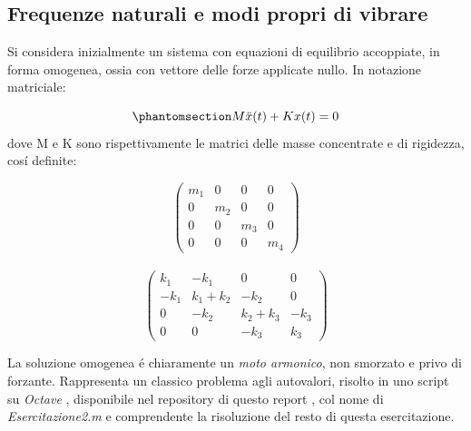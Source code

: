 \documentclass{article}
\begin{document}
        \subsection{Frequenze naturali e modi propri di vibrare\label{Esercitazione_2_modi}}

        Si considera inizialmente un sistema con equazioni di equilibrio accoppiate, in forma omogenea, ossia con vettore
        delle forze applicate nullo. In notazione matriciale: 

            \begin{equation}
                \phantomsection \label{equation:sist_omogeneo}
                M\ddot{x}(t) + Kx(t) = 0
            \end{equation}
        dove M e K sono rispettivamente le matrici delle masse concentrate e di rigidezza, cosí definite:
        \begin{center}  
            \[
            \begin{pmatrix}
                m_1    & 0    & 0     & 0 \\ 
                0      & m_2  & 0     & 0 \\
                0      & 0    & m_3   & 0 \\
                0      & 0    & 0     & m_4 
                
            \end{pmatrix}
            \]
            \\ 
            \[
            \begin{pmatrix}
                k_1    & -k_1       & 0                     & 0 \\ 
                -k_1   & k_1 + k_2  & -k_2                  & 0 \\
                0      & -k_2       & k_2 + k_3             & -k_3 \\
                0      & 0          & -k_3                  & k_3 
                
            \end{pmatrix}
            \]
            
        \end{center}    
    
        La soluzione omogenea é chiaramente un \textit{moto armonico}, non smorzato e privo di forzante.
        Rappresenta un classico problema agli autovalori, risolto in uno script su \textit{Octave} \autocite{Octave}, disponibile 
        nel repository di questo report \autocite{Esercitazioni_strutture}, col nome di \textit{Esercitazione2.m} e comprendente
        la risoluzione del resto di questa esercitazione.
\end{document}

